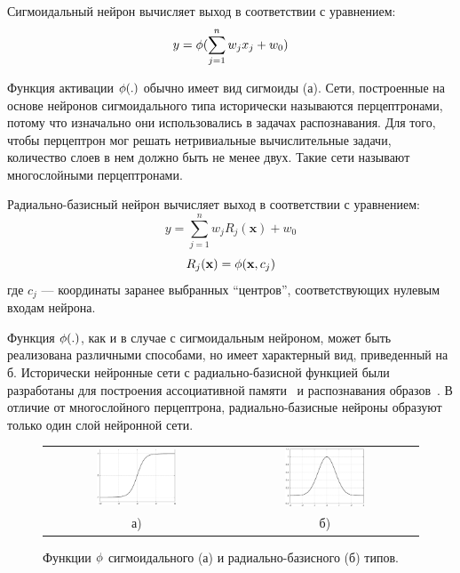 Сигмоидальный нейрон вычисляет выход в соответствии с уравнением:
\begin{equation}
\label{eq:sigm_neuron_output}
y=\fa(\sum_{j=1}^nw_j x_j+w_0)
\end{equation}

Функция активации $\phi(.)$ обычно имеет вид сигмоиды
(а).  Сети, построенные на основе нейронов
сигмоидального типа исторически называются перцептронами, потому что
изначально они использовались в задачах распознавания.  Для того,
чтобы перцептрон мог решать нетривиальные вычислительные задачи,
количество слоев в нем должно быть не менее двух.  Такие сети называют
многослойными перцептронами.

Радиально-базисный нейрон вычисляет выход в соответствии с уравнением:
\begin{equation}
\label{eq:rbf_neuron_output}
y=\sum_{j=1}^nw_j R_j(\mathbf{x})+w_0
\end{equation}
\begin{equation}
\label{eq:rb_function}
R_j(\mathbf{x})=\fa(\mathbf{x},c_j)
\end{equation} где $c_j$ --- координаты заранее выбранных ``центров'',
соответствующих нулевым входам нейрона.

Функция $\phi(.)$, как и в случае с сигмоидальным нейроном, может быть
реализована различными способами, но имеет характерный вид,
приведенный на б.  Исторически нейронные сети с
радиально-базисной функцией были разработаны для построения
ассоциативной памяти~\cite{koh80} и распознавания
образов~\cite{wasser92}.  В отличие от многослойного перцептрона,
радиально-базисные нейроны образуют только один слой нейронной сети.

\begin{figure}[h]
\centering
\begin{tabular}{cc}
\includegraphics[width=0.45\textwidth,%
  totalheight=0.25\textheight]{tanh} &
\includegraphics[width=0.45\textwidth,%
  totalheight=0.25\textheight]{rbf} \\
а) & б)\\
\end{tabular}
\caption{Функции $\phi$ сигмоидального (а) и радиально-базисного (б) типов.}
\label{fig:act_func}
\end{figure}

